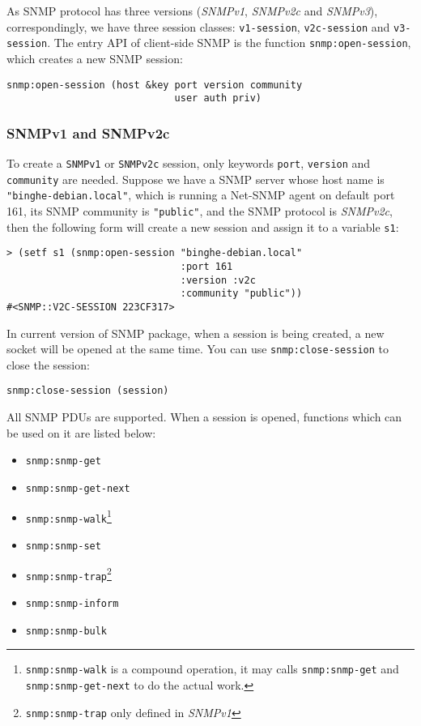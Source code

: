 \documentclass[reprint,9pt]{sigplanconf}
\begin{document}
As SNMP protocol has three versions (\textsl{SNMPv1}, \textsl{SNMPv2c}
and \textsl{SNMPv3}), correspondingly, we have three session classes:
\texttt{v1-session}, \texttt{v2c-session} and \texttt{v3-session}. The
entry API of client-side SNMP is the function
\texttt{snmp:open-session}, which creates a new SNMP session:
%
\begin{verbatim}
snmp:open-session (host &key port version community
                             user auth priv)
\end{verbatim}

\subsubsection{SNMPv1 and SNMPv2c}

To create a \texttt{SNMPv1} or \texttt{SNMPv2c} session, only keywords \texttt{port},
\texttt{version} and \texttt{community} are needed. Suppose we have a
SNMP server whose host name is \texttt{"binghe-debian.local"},
which is running a Net-SNMP agent on default port 161, its SNMP
community is \texttt{"public"}, and the SNMP protocol is
\textsl{SNMPv2c}, then the following form will create a new session
and assign it to a variable \texttt{s1}:
%
\begin{verbatim}
> (setf s1 (snmp:open-session "binghe-debian.local"
                              :port 161
                              :version :v2c
                              :community "public"))
#<SNMP::V2C-SESSION 223CF317>
\end{verbatim}

In current version of SNMP package, when a session is being created, a
new socket will be opened at the same time. You can use
\texttt{snmp:close-session} to close the session:
%
\begin{verbatim}
snmp:close-session (session)
\end{verbatim}

All SNMP PDUs \cite{RFC:3416} are supported. When a session is opened, functions which
can be used on it are listed below:

\begin{itemize}
\item \texttt{snmp:snmp-get}
\item \texttt{snmp:snmp-get-next}
\item \texttt{snmp:snmp-walk}\footnote{\texttt{snmp:snmp-walk} is a compound operation,
it may calls \texttt{snmp:snmp-get} and \texttt{snmp:snmp-get-next} to do
the actual work.}
\item \texttt{snmp:snmp-set}
\item \texttt{snmp:snmp-trap}\footnote{\texttt{snmp:snmp-trap} only defined in \textsl{SNMPv1}}
\item \texttt{snmp:snmp-inform}
\item \texttt{snmp:snmp-bulk}
\end{itemize}
\end{document}
